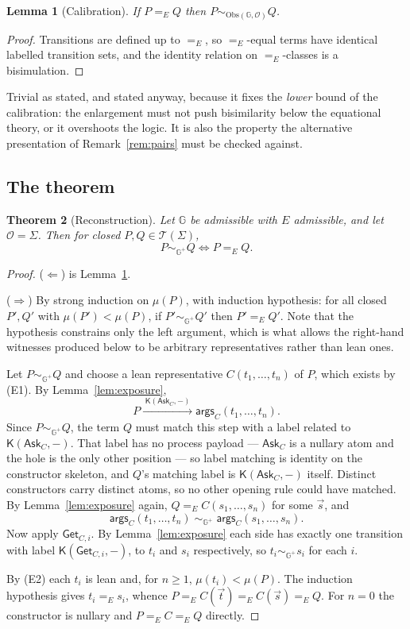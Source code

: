 \documentclass[11pt]{article}
\theoremstyle{plain}
\newtheorem{theorem}{Theorem}
\newtheorem{lemma}[theorem]{Lemma}
\theoremstyle{definition}
\newcommand{\Kc}{\mathsf{K}}
\newcommand{\Gg}{\mathbb{G}}
\newcommand{\Obs}{\mathrm{Obs}}
\newcommand{\Ask}{\mathsf{Ask}}
\newcommand{\Get}{\mathsf{Get}}
\newcommand{\args}{\mathsf{args}}
\newcommand{\bis}{\sim}
\newcommand{\Terms}{\mathcal{T}}
\newcommand{\Ob}{\mathcal{O}}
\begin{document}
\begin{lemma}[Calibration]
\label{lem:calib}
If $P =_E Q$ then $P \bis_{\Obs(\Gg,\Ob)} Q$.
\end{lemma}

\begin{proof}
Transitions are defined up to $=_E$, so $=_E$-equal terms have identical labelled transition sets, and
the identity relation on $=_E$-classes is a bisimulation.
\end{proof}

Trivial as stated, and stated anyway, because it fixes the \emph{lower} bound of the calibration: the
enlargement must not push bisimilarity below the equational theory, or it overshoots the logic. It is
also the property the alternative presentation of Remark~\ref{rem:pairs} must be checked against.

\subsection{The theorem}

\begin{theorem}[Reconstruction]
\label{thm:main}
Let $\Gg$ be admissible with $E$ admissible, and let $\Ob = \Sigma$. Then for closed
$P,Q \in \Terms(\Sigma)$,
\[
P \bis_{\Gg^+} Q \iff P =_E Q .
\]
\end{theorem}

\begin{proof}
($\Leftarrow$) is Lemma~\ref{lem:calib}.

($\Rightarrow$) By strong induction on $\mu(P)$, with induction hypothesis: for all closed $P', Q'$
with $\mu(P') < \mu(P)$, if $P' \bis_{\Gg^+} Q'$ then $P' =_E Q'$. Note that the hypothesis constrains
only the left argument, which is what allows the right-hand witnesses produced below to be arbitrary
representatives rather than lean ones.

Let $P \bis_{\Gg^+} Q$ and choose a lean representative $C(t_1,\dots,t_n)$ of $P$, which exists by
(E1). By Lemma~\ref{lem:exposure},
\[
P \xrightarrow{\;\Kc(\Ask_C,-)\;} \args_C(t_1,\dots,t_n).
\]
Since $P \bis_{\Gg^+} Q$, the term $Q$ must match this step with a label related to
$\Kc(\Ask_C,-)$. That label has no process payload --- $\Ask_C$ is a nullary atom and the hole is the
only other position --- so label matching is identity on the constructor skeleton, and $Q$'s matching
label is $\Kc(\Ask_C,-)$ itself. Distinct constructors carry distinct atoms, so no other opening rule
could have matched. By Lemma~\ref{lem:exposure} again, $Q =_E C(s_1,\dots,s_n)$ for some $\vec s$, and
\[
\args_C(t_1,\dots,t_n) \;\bis_{\Gg^+}\; \args_C(s_1,\dots,s_n).
\]
Now apply $\Get_{C,i}$. By Lemma~\ref{lem:exposure} each side has exactly one transition with label
$\Kc(\Get_{C,i},-)$, to $t_i$ and $s_i$ respectively, so $t_i \bis_{\Gg^+} s_i$ for each $i$.

By (E2) each $t_i$ is lean and, for $n \ge 1$, $\mu(t_i) < \mu(P)$. The induction hypothesis gives
$t_i =_E s_i$, whence $P =_E C(\vec t) =_E C(\vec s) =_E Q$. For $n = 0$ the constructor is nullary and
$P =_E C =_E Q$ directly.
\end{proof}
\end{document}
